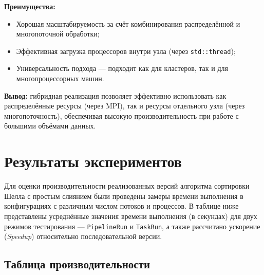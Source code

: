 \documentclass[12pt]{article}
\begin{document}
\textbf{Преимущества:}
\begin{itemize}
  \item Хорошая масштабируемость за счёт комбинирования распределённой и многопоточной обработки;
  \item Эффективная загрузка процессоров внутри узла (через \texttt{std::thread});
  \item Универсальность подхода — подходит как для кластеров, так и для многопроцессорных машин.
\end{itemize}

\textbf{Вывод:} гибридная реализация позволяет эффективно использовать как распределённые ресурсы (через MPI), так и ресурсы отдельного узла (через многопоточность), обеспечивая высокую производительность при работе с большими объёмами данных.

\section{Результаты экспериментов}

\hspace*{1.25em}Для оценки производительности реализованных версий алгоритма сортировки Шелла с простым слиянием были проведены замеры времени выполнения в конфигурациях с различным числом потоков и процессов. В таблице ниже представлены усреднённые значения времени выполнения (в секундах) для двух режимов тестирования — \texttt{PipelineRun} и \texttt{TaskRun}, а также рассчитано ускорение (\textit{Speedup}) относительно последовательной версии.

\subsection{Таблица производительности}
\end{document}
